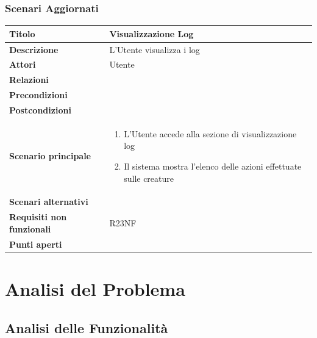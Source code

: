 \documentclass[a4paper, 11pt]{article}
\begin{document}
\subsubsection{Scenari Aggiornati}

\begin{center}
    \begin{tabular}{ |p{5cm}|p{9.5cm}|  }
        \hline
        \textbf{Titolo} & Visualizzazione Log \\
        \hline
        \textbf{Descrizione} & L'Utente visualizza i log \\
        \hline
        \textbf{Attori} & Utente \\
        \hline
        \textbf{Relazioni} & \\
        \hline
        \textbf{Precondizioni} &  \\
        \hline
        \textbf{Postcondizioni} & \\
        \hline
        \textbf{Scenario principale} & 
        \begin{enumerate}
            \item L'Utente accede alla sezione di visualizzazione log
            \item Il sistema mostra l'elenco delle azioni effettuate sulle creature
        \end{enumerate}
        \\
        \hline
        \textbf{Scenari alternativi} & \\
        \hline
        \textbf{Requisiti non funzionali} & R23NF\\
        \hline
        \textbf{Punti aperti} &  \\
        \hline
    \end{tabular}
\end{center}



\newpage
\section{Analisi del Problema}
\subsection{Analisi delle Funzionalità}
\end{document}
